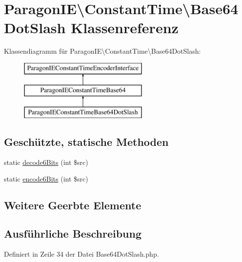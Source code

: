 \hypertarget{class_paragon_i_e_1_1_constant_time_1_1_base64_dot_slash}{}\section{Paragon\+IE\textbackslash{}Constant\+Time\textbackslash{}Base64\+Dot\+Slash Klassenreferenz}
\label{class_paragon_i_e_1_1_constant_time_1_1_base64_dot_slash}
Klassendiagramm für Paragon\+IE\textbackslash{}Constant\+Time\textbackslash{}Base64\+Dot\+Slash\+:\begin{figure}[H]
\begin{center}
\leavevmode
\includegraphics[height=3.000000cm]{class_paragon_i_e_1_1_constant_time_1_1_base64_dot_slash}
\end{center}
\end{figure}
\subsection*{Geschützte, statische Methoden}
\begin{DoxyCompactItemize}
\item 
static \mbox{\hyperlink{class_paragon_i_e_1_1_constant_time_1_1_base64_dot_slash_a7e7b40f1f8c3ee60c6d11f8ab09b7054}{decode6\+Bits}} (int \$src)
\item 
static \mbox{\hyperlink{class_paragon_i_e_1_1_constant_time_1_1_base64_dot_slash_ae4548b2da7572b6981e4ffb103b5fe6e}{encode6\+Bits}} (int \$src)
\end{DoxyCompactItemize}
\subsection*{Weitere Geerbte Elemente}


\subsection{Ausführliche Beschreibung}


Definiert in Zeile 34 der Datei Base64\+Dot\+Slash.\+php.



